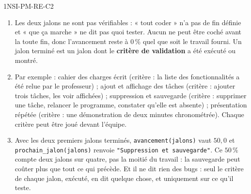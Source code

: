 \begin{corrige}{1NSI-PM-RE-C2}
\begin{enumerate}
  \item Les deux jalons ne sont pas vérifiables : « tout coder » n'a pas de fin définie et
        « que ça marche » ne dit pas quoi tester. Aucun ne peut être coché avant la toute
        fin, donc l'avancement reste à $0\,\%$ quel que soit le travail fourni. Un jalon
        terminé est un jalon dont le \textbf{critère de validation} a été exécuté ou montré.
  \item Par exemple : cahier des charges écrit (critère : la liste des fonctionnalités a été
        relue par le professeur) ; ajout et affichage des tâches (critère : ajouter trois
        tâches, les voir affichées) ; suppression et sauvegarde (critère : supprimer une
        tâche, relancer le programme, constater qu'elle est absente) ; présentation répétée
        (critère : une démonstration de deux minutes chronométrée). Chaque critère peut être
        joué devant l'équipe.
  \item Avec les deux premiers jalons terminés, \lstinline{avancement(jalons)} vaut
        $50{,}0$ et \lstinline{prochain_jalon(jalons)} renvoie
        \lstinline{"Suppression et sauvegarde"}. Ce $50\,\%$ compte deux jalons sur quatre,
        pas la moitié du travail : la sauvegarde peut coûter plus que tout ce qui précède. Et
        il ne dit rien des bugs : seul le critère de chaque jalon, exécuté, en dit quelque
        chose, et uniquement sur ce qu'il teste.
\end{enumerate}
\end{corrige}
